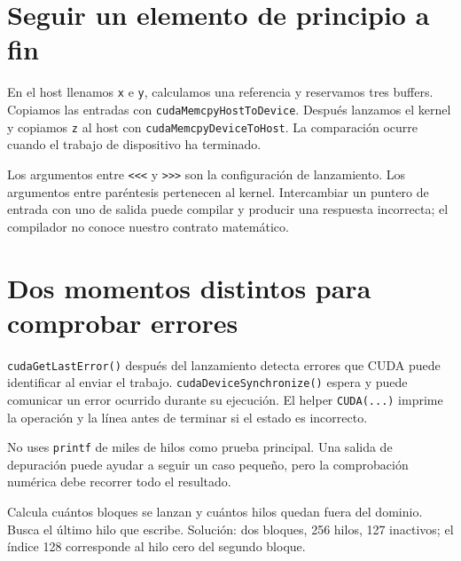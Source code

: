\documentclass[12pt,a4paper,oneside]{report}
\begin{document}
\section{Seguir un elemento de principio a fin}
En el host llenamos \texttt{x} e \texttt{y}, calculamos una referencia y reservamos tres buffers. Copiamos las entradas con \texttt{cudaMemcpyHo\allowbreak{}stToDevice}. Después lanzamos el kernel y copiamos \texttt{z} al host con \texttt{cudaMemcpyDe\allowbreak{}viceToHost}. La comparación ocurre cuando el trabajo de dispositivo ha terminado.

\begin{center}
\end{center}
Los argumentos entre \texttt{<<<} y \texttt{>>>} son la configuración de lanzamiento. Los argumentos entre paréntesis pertenecen al kernel. Intercambiar un puntero de entrada con uno de salida puede compilar y producir una respuesta incorrecta; el compilador no conoce nuestro contrato matemático.

\section{Dos momentos distintos para comprobar errores}
\texttt{cudaGetLastError()} después del lanzamiento detecta errores que CUDA puede identificar al enviar el trabajo. \texttt{cudaDeviceSy\allowbreak{}nchronize()} espera y puede comunicar un error ocurrido durante su ejecución. El helper \texttt{CUDA(...)} imprime la operación y la línea antes de terminar si el estado es incorrecto. \cite{cuda-runtime}

No uses \texttt{printf} de miles de hilos como prueba principal. Una salida de depuración puede ayudar a seguir un caso pequeño, pero la comprobación numérica debe recorrer todo el resultado.

\begin{practica}
Calcula cuántos bloques se lanzan y cuántos hilos quedan fuera del dominio. Busca el último hilo que escribe. Solución: dos bloques, 256 hilos, 127 inactivos; el índice 128 corresponde al hilo cero del segundo bloque.

\end{practica}
\end{document}
